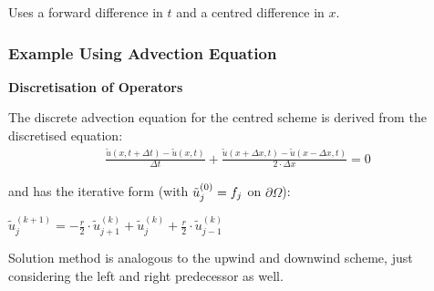 
Uses a forward difference in $t$ and a centred difference in $x$.

\subsubsection{Example Using Advection Equation}


\textbf{Discretisation of Operators}

The discrete advection equation for the centred scheme is derived from the discretised equation:
\begin{align*}
	{\frac{\tilde{u}(x,t+\Delta t)-\tilde{u}(x,t)}{\Delta t}}+{\frac{\tilde{u}(x+\Delta x,t)-\tilde{u}(x-\Delta x,t)}{2\cdot\Delta x}}=0
\end{align*}

and has the iterative form (with $\tilde{u}_j^{(0)}=f_j$ on $\partial\Omega$):

\colorbox{shadecolor}{$
	\tilde{u}_{j}^{(k+1)}=-\frac{r}{2}\cdot\tilde{u}_{j+1}^{(k)}+\tilde{u}_{j}^{(k)}+\frac{r}{2}\cdot\tilde{u}_{j-1}^{(k)}
$}

Solution method is analogous to the upwind and downwind scheme,
just considering the left and right predecessor as well.
